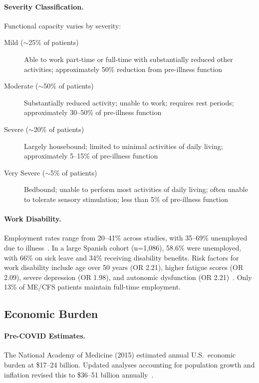 \paragraph{Severity Classification.}
Functional capacity varies by severity:
\begin{description}
    \item[Mild ($\sim$25\% of patients)] Able to work part-time or full-time with substantially reduced other activities; approximately 50\% reduction from pre-illness function
    \item[Moderate ($\sim$50\% of patients)] Substantially reduced activity; unable to work; requires rest periods; approximately 30--50\% of pre-illness function
    \item[Severe ($\sim$20\% of patients)] Largely housebound; limited to minimal activities of daily living; approximately 5--15\% of pre-illness function
    \item[Very Severe ($\sim$5\% of patients)] Bedbound; unable to perform most activities of daily living; often unable to tolerate sensory stimulation; less than 5\% of pre-illness function
\end{description}

\paragraph{Work Disability.}
Employment rates range from 20--41\% across studies, with 35--69\% unemployed due to illness~\cite{CastroMarrero2019employment}. In a large Spanish cohort (n=1,086), 58.6\% were unemployed, with 66\% on sick leave and 34\% receiving disability benefits. Risk factors for work disability include age over 50 years (OR 2.21), higher fatigue scores (OR 2.09), severe depression (OR 1.98), and autonomic dysfunction (OR 2.21)~\cite{CastroMarrero2019employment}. Only 13\% of ME/CFS patients maintain full-time employment.

\subsection{Economic Burden}
\label{subsec:economic}

\paragraph{Pre-COVID Estimates.}
The National Academy of Medicine (2015) estimated annual U.S.\ economic burden at \$17--24 billion. Updated analyses accounting for population growth and inflation revised this to \$36--51 billion annually~\cite{Jason2020economic}.


